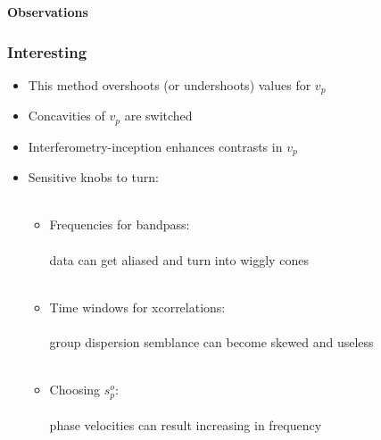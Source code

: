 \documentclass{beamer}
\begin{document}
\frame
{
\centering
{\bf Observations}
}
\frame
{
\frametitle{{\bf Interesting}}
\begin{itemize}
\item This method overshoots (or undershoots) values for $v_p$
\item Concavities of $v_p$ are switched
\item Interferometry-inception enhances contrasts in $v_p$
\item Sensitive knobs to turn:
\\~\\
\begin{itemize}
\item Frequencies for bandpass:
\\~\\
data can get aliased and turn into wiggly cones
\\~\\
\item Time windows for xcorrelations:
\\~\\
group dispersion semblance can become skewed and useless
\\~\\
\item Choosing $s_p^o$:
\\~\\
phase velocities can result increasing in frequency
\\~\\
\end{itemize}
\end{itemize}
}
\end{document}
